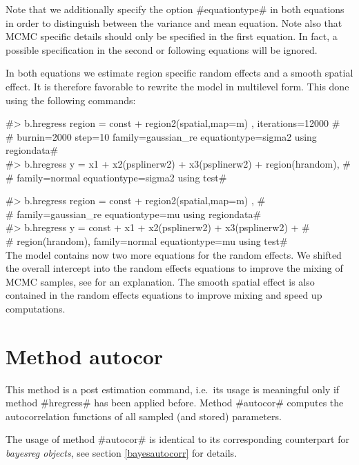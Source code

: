 Note that we additionally specify the option #equationtype# in both equations
in order to distinguish between the variance and mean equation.
Note also that MCMC specific details should only be specified in the first equation.
In fact, a possible specification in the second or following equations will be ignored.

In both equations we estimate region specific random effects and a smooth spatial effect. It is therefore
favorable to rewrite the model in multilevel form. This done using the following commands:


#> b.hregress region = const  + region2(spatial,map=m) , iterations=12000 # \\
#  burnin=2000 step=10 family=gaussian_re equationtype=sigma2 using regiondata# \\

#> b.hregress y =  x1 + x2(psplinerw2) + x3(psplinerw2) + region(hrandom), # \\
#  family=normal equationtype=sigma2 using test#


#> b.hregress region = const  + region2(spatial,map=m) ,  # \\
#   family=gaussian_re equationtype=mu using regiondata# \\


#> b.hregress y = const + x1 + x2(psplinerw2) + x3(psplinerw2) + # \\
#  region(hrandom),  family=normal equationtype=mu using test# \\

The model contains now two more equations for the random effects. We shifted the overall intercept into
the random effects equations to improve the mixing of MCMC samples, see  for an explanation.
The smooth spatial effect is also contained in the random effects equations to improve mixing and speed up computations.

\section{Method autocor}
\label{mcmcautocorr} 



This method is a post estimation command, i.e.~its usage is
meaningful only if method #hregress# has been applied before. Method
#autocor# computes the autocorrelation functions of all sampled (and
stored) parameters.

The usage of method #autocor# is identical to its corresponding counterpart for {\em
bayesreg objects}, see section \ref{bayesautocorr} for details.


